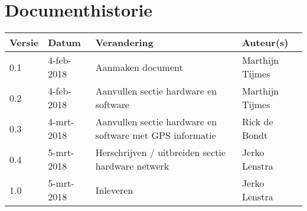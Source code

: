 \section{Documenthistorie}

\begin{tabularx}{\textwidth}{| l | l | X | l |}
    \hline
    \textbf{Versie} & \textbf{Datum} & \textbf{Verandering} & \textbf{Auteur(s)}
    \\ \hline
    0.1	& 4-feb-2018 & Aanmaken document & Marthijn Tijmes \\ \hline
    0.2 & 4-feb-2018 & Aanvullen sectie hardware en software & Marthijn Tijmes \\ \hline
    0.3 & 4-mrt-2018 & Aanvullen sectie hardware en software met GPS informatie & Rick de Bondt \\ \hline
    0.4 & 5-mrt-2018 & Herschrijven / uitbreiden sectie hardware netwerk & Jerko Lenstra \\ \hline
    1.0 & 5-mrt-2018 & Inleveren & Jerko Lenstra \\ \hline

\end{tabularx}
